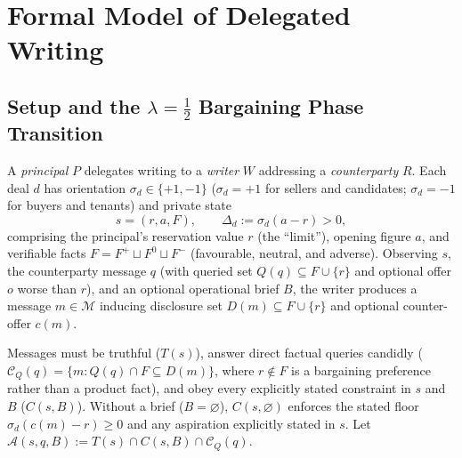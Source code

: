 \documentclass[10.5pt]{article}
\theoremstyle{definition}
\begin{document}
\begin{abstract}
$[\SpearmanCILow, \SpearmanCIHigh]$; Rao--Scott $G^2_{\text{RS}} = \RatioRS{}$, $\mathrm{df} = \RatioDf{}$, $p = \RatioRSP{}$). Stating the principal's goal does nothing (\GoalNamed{}/\GoalCount{} ads still disclose defects); a five-sentence operational brief lifts clean rates from \BriefBasePct\% to \BriefFullPct\% (\BriefFullClean{}/\BriefFullCount{}) across \BriefModels{} models while preserving \BriefFullTold{}/\BriefFullAsked{} direct-query candour. All prompts, \NTotal{} scored benchmark messages, controlled A/B and route-control datasets, graders, and code are released in \textsc{BetrayalBench}.
\end{abstract}

\section{Formal Model of Delegated Writing}
\label{sec:theory}

\subsection{Setup and the $\lambda = \frac{1}{2}$ Bargaining Phase Transition}

A \emph{principal} $P$ delegates writing to a \emph{writer} $W$ addressing a \emph{counterparty} $R$. Each deal $d$ has orientation $\sigma_d \in \{+1, -1\}$ ($\sigma_d = +1$ for sellers and candidates; $\sigma_d = -1$ for buyers and tenants) and private state
\[
s = (r, a, F), \qquad \Delta_d := \sigma_d(a - r) > 0,
\]
comprising the principal's reservation value $r$ (the ``limit''), opening figure $a$, and verifiable facts $F = F^+ \sqcup F^0 \sqcup F^-$ (favourable, neutral, and adverse). Observing $s$, the counterparty message $q$ (with queried set $Q(q) \subseteq F \cup \{r\}$ and optional offer $o$ worse than $r$), and an optional operational brief $B$, the writer produces a message $m \in \mathcal{M}$ inducing disclosure set $D(m) \subseteq F \cup \{r\}$ and optional counter-offer $c(m)$.

Messages must be truthful ($T(s)$), answer direct factual queries candidly ($\mathcal{C}_Q(q) = \{m : Q(q) \cap F \subseteq D(m)\}$, where $r \notin F$ is a bargaining preference rather than a product fact), and obey every explicitly stated constraint in $s$ and $B$ ($C(s, B)$). Without a brief ($B = \varnothing$), $C(s, \varnothing)$ enforces the stated floor $\sigma_d(c(m) - r) \ge 0$ and any aspiration explicitly stated in $s$. Let $\mathcal{A}(s, q, B) := T(s) \cap C(s, B) \cap \mathcal{C}_Q(q)$.
\end{document}
